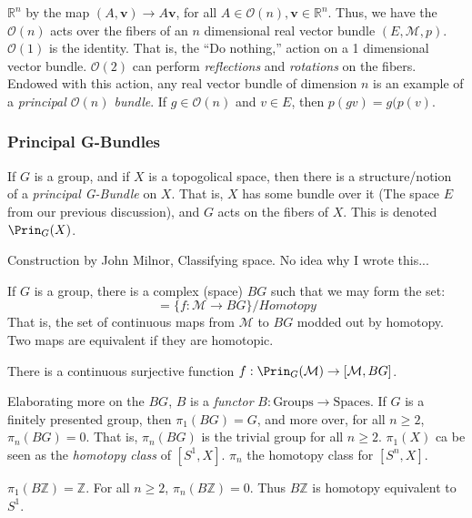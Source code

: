 \documentclass[crop=false,class=book,oneside]{standalone}                      %
\begin{document}
            $\mathbb{R}^{n}$ by the map
            $(A,\mathbf{v})\rightarrow{A\mathbf{v}}$,
            for all $A\in\mathcal{O}(n),\mathbf{v}\in\mathbb{R}^{n}$.
            Thus, we have the $\mathcal{O}(n)$ acts over the fibers
            of an $n$ dimensional real vector bundle
            $(E,\mathcal{M},p)$. $\mathcal{O}(1)$ is the identity.
            That is, the ``Do nothing,'' action on a 1 dimensional
            vector bundle. $\mathcal{O}(2)$ can perform
            \textit{reflections} and \textit{rotations} on the
            fibers. Endowed with this action, any real
            vector bundle of dimension $n$ is an example of
            a \textit{principal $\mathcal{O}(n)$ bundle}.
            If $g\in\mathcal{O}(n)$ and $v\in{E}$,
            then $p(gv)=g(p(v)$.
        \subsubsection{Principal G-Bundles}
            If $G$ is a group, and if $X$ is a
            topogolical space, then there is a
            structure/notion of a
            \textit{principal G-Bundle} on $X$.
            That is, $X$ has some bundle over it
            (The space $E$ from our previous discussion),
            and $G$ acts on the fibers of $X$. This is
            denoted $\Prin_{G}(X)$.
            \par\hfill\par
            Construction by John Milnor, Classifying space.
            No idea why I wrote this...
            \par\hfill\par
            If $G$ is a group, there is a complex (space) $BG$
            such that we may form the set:
            \begin{equation*}
                [\mathcal{M},BG]
                =\{f:\mathcal{M}\rightarrow{BG}\}/Homotopy
            \end{equation*}
            That is, the set of continuous maps from $\mathcal{M}$ to
            $BG$ modded out by homotopy. Two maps are equivalent if they
            are homotopic.
            \begin{theorem}
                There is a continuous surjective function
                $f:\Prin_{G}(\mathcal{M})\rightarrow%
                 [\mathcal{M},BG]$.
            \end{theorem}
            Elaborating more on the $BG$,
            $B$ is a \textit{functor}
            $B:\textrm{Groups}\rightarrow\textrm{Spaces}$.
            If $G$ is a finitely presented group,
            then $\pi_{1}(BG)=G$, and more over,
            for all $n\geq{2}$,
            $\pi_{n}(BG)=0$. That is, $\pi_{n}(BG)$
            is the trivial group for all $n\geq{2}$.
            $\pi_{1}(X)$ ca be seen as the
            \textit{homotopy class} of $[S^{1},X]$.
            $\pi_{n}$ the homotopy class for
            $[S^{n},X]$.
            \begin{example}
                $\pi_{1}(B\mathbb{Z})=\mathbb{Z}$.
                For all $n\geq{2}$,
                $\pi_{n}(B\mathbb{Z})=0$.
                Thus $B\mathbb{Z}$ is homotopy
                equivalent to $S^{1}$.
            \end{example}
\end{document}
